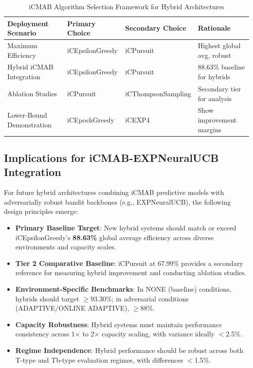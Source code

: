 \documentclass[12pt,a4paper]{article}
\begin{document}
\begin{table}[H]
\centering
\caption{iCMAB Algorithm Selection Framework for Hybrid Architectures}
\begin{tabular}{|l|l|l|l|}
\hline
\textbf{Deployment Scenario} & \textbf{Primary Choice} & \textbf{Secondary Choice} & \textbf{Rationale} \\
\hline
\hline
Maximum Efficiency & iCEpsilonGreedy & iCPursuit & Highest global avg, robust \\
Hybrid iCMAB Integration & iCEpsilonGreedy & iCPursuit & 88.63\% baseline for hybrids \\
Ablation Studies & iCPursuit & iCThompsonSampling & Secondary tier for analysis \\
Lower-Bound Demonstration & iCEpochGreedy & iCEXP4 & Show improvement margins \\
\hline
\end{tabular}
\end{table}

\subsection{Implications for iCMAB-EXPNeuralUCB Integration}

For future hybrid architectures combining iCMAB predictive models with adversarially robust bandit backbones (e.g., EXPNeuralUCB), the following design principles emerge:

\begin{itemize}
\item \textbf{Primary Baseline Target}: New hybrid systems should match or exceed iCEpsilonGreedy's \textbf{88.63\%} global average efficiency across diverse environments and capacity scales.
\item \textbf{Tier 2 Comparative Baseline}: iCPursuit at 67.99\% provides a secondary reference for measuring hybrid improvement and conducting ablation studies.
\item \textbf{Environment-Specific Benchmarks}: In NONE (baseline) conditions, hybrids should target $\geq$93.30\%; in adversarial conditions (ADAPTIVE/ONLINE ADAPTIVE), $\geq$88\%.
\item \textbf{Capacity Robustness}: Hybrid systems must maintain performance consistency across 1$\times$ to 2$\times$ capacity scaling, with variance ideally $<$2.5\%.
\item \textbf{Regime Independence}: Hybrid performance should be robust across both T-type and Tb-type evaluation regimes, with differences $<$1.5\%.
\end{itemize}
\end{document}
